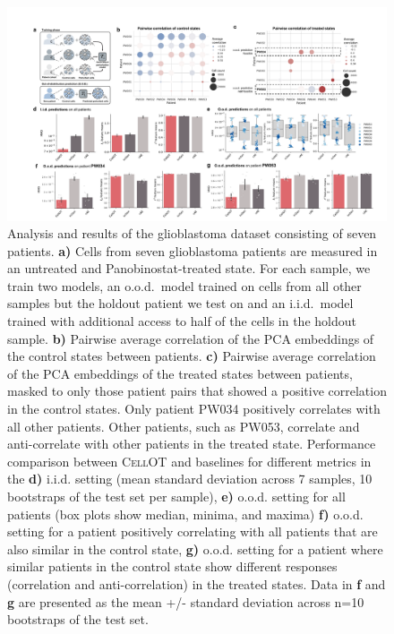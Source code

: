 \begin{figure}[H]
    \centering
    \includegraphics[width=1.05\textwidth]{./figures/cellot-methods/Bunne_ED_Fig6.pdf}
    \caption{Analysis and results of the glioblastoma dataset consisting of seven patients. \textbf{a)} Cells from seven glioblastoma patients are measured in an untreated and Panobinostat-treated state. For each sample, we train two models, an o.o.d.~model trained on cells from all other samples but the holdout patient we test on and an i.i.d.~model trained with additional access to half of the cells in the holdout sample.
    \textbf{b)} Pairwise average correlation of the PCA embeddings of the control states between patients. \textbf{c)} Pairwise average correlation of the PCA embeddings of the treated states between patients, masked to only those patient pairs that showed a positive correlation in the control states. Only patient PW034 positively correlates with all other patients. Other patients, such as PW053, correlate and anti-correlate with other patients in the treated state.
    Performance comparison between \textsc{CellOT} and baselines for different metrics in the \textbf{d)} i.i.d. setting (mean standard deviation across 7 samples, 10 bootstraps of the test set per sample),
    \textbf{e)} o.o.d. setting for all patients (box plots show median, minima, and maxima)
    \textbf{f)} o.o.d. setting for a patient positively correlating with all patients that are also similar in the control state,
    \textbf{g)} o.o.d. setting for a patient where similar patients in the control state show different responses (correlation and anti-correlation) in the treated states. Data in \textbf{f} and \textbf{g} are presented as the mean +/- standard deviation across n=10 bootstraps of the test set.
    }
    \label{supp_fig:gbm_patients_iid_ood}
\end{figure}


